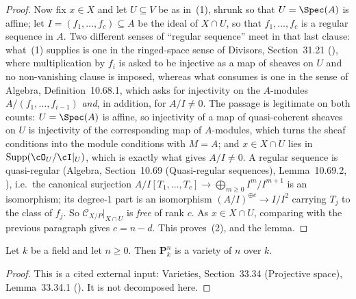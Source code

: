 \begin{proof}
Now fix $x\in X$ and let $U\subseteq V$ be as in~(1), shrunk so that
$U=\Spec(A)$ is affine; let $I=(f_1,\dots,f_c)\subseteq A$ be the ideal of
$X\cap U$, so that $f_1,\dots,f_c$ is a regular sequence in $A$.  Two
different senses of ``regular sequence'' meet in that last clause: what~(1)
supplies is one in the ringed-space sense of Divisors, Section~31.21
(), where multiplication by $f_i$ is asked to
be injective as a map of sheaves on $U$ and no non-vanishing clause is imposed,
whereas what  consumes is one in the sense of
Algebra, Definition~10.68.1, which asks for injectivity on the $A$-modules
$A/(f_1,\dots,f_{i-1})$ \emph{and}, in addition, for $A/I\neq0$.  The passage
is legitimate on both counts: $U=\Spec(A)$ is affine, so injectivity of a map of
quasi-coherent sheaves on $U$ is injectivity of the corresponding map of
$A$-modules, which turns the sheaf conditions into the module conditions with
$M=A$; and $x\in X\cap U$ lies in
$\operatorname{Supp}(\cO_U/\cI|_U)$, which is exactly what gives $A/I\neq0$.  A
regular sequence is quasi-regular (Algebra, Section~10.69 (Quasi-regular
sequences), Lemma~10.69.2, ), i.e.\ the
canonical
surjection
$A/I[T_1,\dots,T_c]\to\bigoplus_{m\ge0}I^m/I^{m+1}$ is an isomorphism; its
degree-$1$ part is an isomorphism $(A/I)^{\oplus c}\to I/I^2$ carrying
$T_j$ to the class of $f_j$.  So $\mathcal C_{X/P}|_{X\cap U}$ is
\emph{free} of rank $c$.  As $x\in X\cap U$, comparing with the previous
paragraph gives $c=n-d$.  This proves~(2), and the lemma.
\end{proof}

\begin{lemma}
\label{lem:pc-projective-space-smooth}
Let $k$ be a field and let $n\ge0$.  Then $\mathbf P^n_k$ is a
 variety of
 $n$ over $k$.
\end{lemma}
\begin{proof}
This is a cited external input: Varieties, Section~33.34 (Projective
space), Lemma~33.34.1 ().  It is not decomposed here.
\end{proof}

